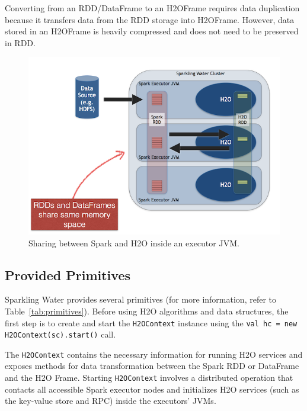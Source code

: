 \documentclass{standalone}
\begin{document}
Converting from an RDD/DataFrame to an H2OFrame requires data duplication because it transfers data from the RDD storage into H2OFrame. However, data stored in an H2OFrame is heavily compressed and does not need to be preserved in RDD.

\begin{figure}[h!]
	\centering
	\includegraphics[scale=1]{sw/images/DataShare.png}
	\caption{Sharing between Spark and H2O inside an executor JVM.}
\end{figure}


\subsection{Provided Primitives}

Sparkling Water provides several primitives (for more information, refer to Table~\ref{tab:primitives}). Before using H2O algorithms and data structures, the first step is to create and start the \texttt{H2OContext} instance using the \texttt{val hc = new H2OContext(sc).start()} call. 

The \texttt{H2OContext} contains the necessary information for running H2O services and exposes methods for data transformation between the Spark RDD or DataFrame and the H2O Frame. Starting \texttt{H2OContext} involves a distributed operation that contacts all accessible Spark executor nodes and initializes H2O services (such as the key-value store and RPC) inside the executors' JVMs.
\end{document}
